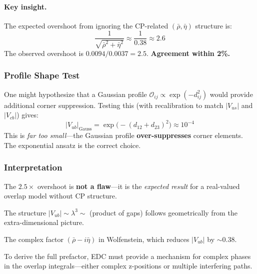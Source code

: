 \paragraph{Key insight.}
The expected overshoot from ignoring the CP-related $(\bar\rho, \bar\eta)$ structure is:
\begin{equation}
    \frac{1}{\sqrt{\bar\rho^2 + \bar\eta^2}} \approx \frac{1}{0.38} \approx 2.6
    \label{eq:ch7_overshoot_expected}
\end{equation}
The observed overshoot is $0.0094/0.0037 = 2.5$. \textbf{Agreement within 2\%.}

\subsubsection{Profile Shape Test}

One might hypothesize that a Gaussian profile $\mathcal{O}_{ij} \propto \exp(-d_{ij}^2)$
would provide additional corner suppression. Testing this (with recalibration to match
$|V_{us}|$ and $|V_{cb}|$) gives:
\begin{equation}
    |V_{ub}|_{\text{Gauss}} = \exp\bigl(-(d_{12}+d_{23})^2\bigr) \approx 10^{-4}
    \label{eq:ch7_gaussian_corner}
\end{equation}
This is \emph{far too small}---the Gaussian profile \textbf{over-suppresses} corner
elements. The exponential ansatz is the correct choice.

\subsubsection{Interpretation}

\begin{tcolorbox}[colback=blue!5, colframe=blue!50!black,
    title=\textbf{Attempt 2.2 Resolution}]
The $2.5\times$ overshoot is \textbf{not a flaw}---it is the \emph{expected result}
for a real-valued overlap model without CP structure.

\begin{description}[nosep, font=\normalfont\bfseries]
    \item[What the overlap model captures \tagDc{}:]
        The structure $|V_{ub}| \sim \lambda^3 \sim$ (product of gaps)
        follows geometrically from the extra-dimensional picture.

    \item[What the overlap model misses \tagI{}:]
        The complex factor $(\bar\rho - i\bar\eta)$ in Wolfenstein,
        which reduces $|V_{ub}|$ by $\sim 0.38$.

    \item[Physical implication:]
        To derive the full prefactor, EDC must provide a mechanism for complex
        phases in the overlap integrals---either complex z-positions or
        multiple interfering paths.
\end{description}
\end{tcolorbox}

